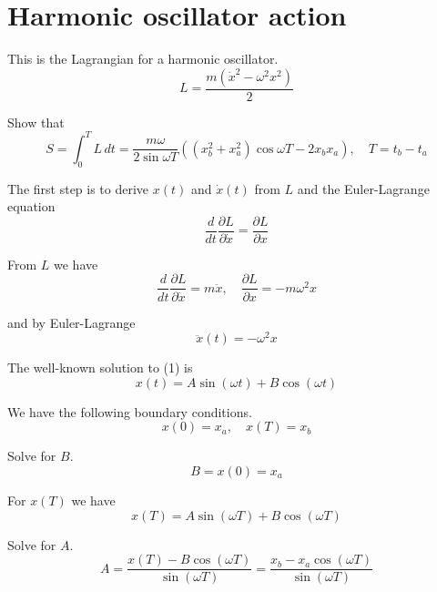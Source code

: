 


\section*{Harmonic oscillator action}

This is the Lagrangian for a harmonic oscillator.
\begin{equation*}
L=\frac{m(\dot x^2-\omega^2x^2)}{2}
\end{equation*}

Show that
\begin{equation*}
S=\int_0^TL\,dt=\frac{m\omega}{2\sin\omega T}
\left((x_b^2+x_a^2)\cos\omega T-2x_bx_a\right),\quad
T=t_b-t_a
\end{equation*}

The first step is to derive $x(t)$ and $\dot x(t)$ from $L$ and the Euler-Lagrange equation
\begin{equation*}
\frac{d}{dt}\frac{\partial L}{\partial\dot x}=\frac{\partial L}{\partial x}
\end{equation*}

From $L$ we have
\begin{equation*}
\frac{d}{dt}\frac{\partial L}{\partial\dot x}=m\ddot x,\quad
\frac{\partial L}{\partial x}=-m\omega^2x
\end{equation*}

and by Euler-Lagrange
\begin{equation*}
\ddot x(t)=-\omega^2x
\tag{1}
\end{equation*}

The well-known solution to (1) is
\begin{equation*}
x(t)=A\sin(\omega t)+B\cos(\omega t)
\end{equation*}

We have the following boundary conditions.
\begin{equation*}
x(0)=x_a,\quad
x(T)=x_b
\tag{2}
\end{equation*}

Solve for $B$.
\begin{equation*}
B=x(0)=x_a
\end{equation*}

For $x(T)$ we have
\begin{equation*}
x(T)=A\sin(\omega T)+B\cos(\omega T)
\end{equation*}

Solve for $A$.
\begin{equation*}
A=\frac{x(T)-B\cos(\omega T)}{\sin(\omega T)}=
\frac{x_b-x_a\cos(\omega T)}{\sin(\omega T)}
\end{equation*}

